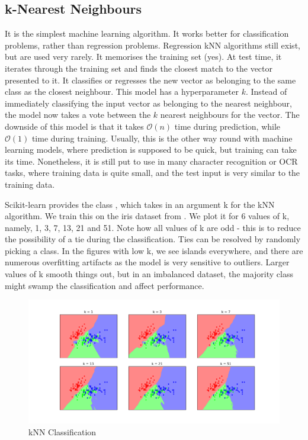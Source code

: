\documentclass{article}
\newcommand{\code}[1]{{\fontfamily{zi4} \selectfont{#1}}}
\begin{document}
\subsection{k-Nearest Neighbours}

It is the simplest machine learning algorithm. It works better for classification problems, rather than regression problems. Regression kNN algorithms still exist, but are used very rarely. It memorises the training set (yes). At test time, it iterates through the training set and finds the closest match to the vector presented to it. It classifies or regresses the new vector as belonging to the same class as the closest neighbour. This model has a hyperparameter $k$. Instead of immediately classifying the input vector as belonging to the nearest neighbour, the model now takes a vote between the $k$ nearest neighbours for the vector. The downside of this model is that it takes $\mathcal{O}(n)$ time during prediction, while $\mathcal{O}(1)$ time during training. Usually, this is the other way round with machine learning models, where prediction is supposed to be quick, but training can take its time. Nonetheless, it is still put to use in many character recognition or OCR tasks, where training data is quite small, and the test input is very similar to the training data.

Scikit-learn provides the class \code{sklearn.neighbors.KNeighborsClassifier}, which takes in an argument k for the kNN algorithm. We train this on the iris dataset from \code{sklearn.datasets.load\_iris}. We plot it for 6 values of k, namely, 1, 3, 7, 13, 21 and 51. Note how all values of k are odd - this is to reduce the possibility of a tie during the classification. Ties can be resolved by randomly picking a class. In the figures with low k, we see islands everywhere, and there are numerous overfitting artifacts as the model is very sensitive to outliers. Larger values of k smooth things out, but in an imbalanced dataset, the majority class might swamp the classification and affect performance. 

\begin{figure}[H]
\centering
\includegraphics[width=\linewidth]{Images/knnclassifier.png}
\caption{kNN Classification}
\end{figure}
\end{document}

